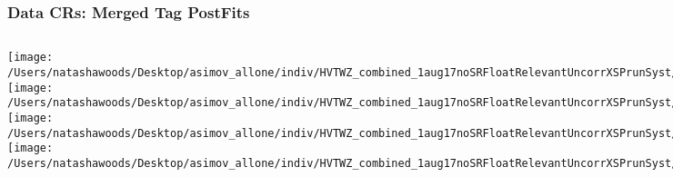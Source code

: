 \documentclass{beamer}
\begin{document}
\begin{frame}
\frametitle{Data CRs: Merged Tag PostFits}
    \begin{columns}[t]

       \texttt{[image: /Users/natashawoods/Desktop/asimov\_allone/indiv/HVTWZ\_combined\_1aug17noSRFloatRelevantUncorrXSPrunSyst/L1\_MergHP\_GGF\_WZ\_Tag\_TCR.pdf]}
       \texttt{[image: /Users/natashawoods/Desktop/asimov\_allone/indiv/HVTWZ\_combined\_1aug17noSRFloatRelevantUncorrXSPrunSyst/L1\_MergHP\_GGF\_WZ\_Tag\_WCR.pdf]}   
       \texttt{[image: /Users/natashawoods/Desktop/asimov\_allone/indiv/HVTWZ\_combined\_1aug17noSRFloatRelevantUncorrXSPrunSyst/L1\_MergLP\_GGF\_WZ\_Tag\_TCR.pdf]}
       \texttt{[image: /Users/natashawoods/Desktop/asimov\_allone/indiv/HVTWZ\_combined\_1aug17noSRFloatRelevantUncorrXSPrunSyst/L1\_MergLP\_GGF\_WZ\_Tag\_WCR.pdf]}   
       
       \texttt{[image: /Users/natashawoods/Desktop/asimov\_allone/indiv/HVTWZ\_combined\_1aug17noSRFloatRelevantUncorrXSSingleBinPrunSyst/L1\_MergHP\_GGF\_WZ\_Tag\_TCR.pdf]}
       \texttt{[image: /Users/natashawoods/Desktop/asimov\_allone/indiv/HVTWZ\_combined\_1aug17noSRFloatRelevantUncorrXSSingleBinPrunSyst/L1\_MergHP\_GGF\_WZ\_Tag\_WCR.pdf]}   
       \texttt{[image: /Users/natashawoods/Desktop/asimov\_allone/indiv/HVTWZ\_combined\_1aug17noSRFloatRelevantUncorrXSSingleBinPrunSyst/L1\_MergLP\_GGF\_WZ\_Tag\_TCR.pdf]}
       \texttt{[image: /Users/natashawoods/Desktop/asimov\_allone/indiv/HVTWZ\_combined\_1aug17noSRFloatRelevantUncorrXSSingleBinPrunSyst/L1\_MergLP\_GGF\_WZ\_Tag\_WCR.pdf]}   
\end{columns}
\end{frame}
\end{document}
